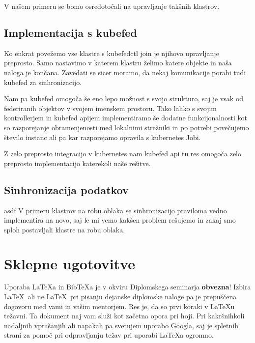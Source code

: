 \documentclass[a4paper, 12pt]{book}
\newcommand{\BibTeX}{{\sc Bib}\TeX}
\begin{document}
V našem primeru se bomo osredotočali na upravljanje takšnih klastrov.

\section{Implementacija s kubefed}
Ko enkrat povežemo vse klastre s kubefedctl join je njihovo upravljanje preprosto.
Samo nastavimo v katerem klastru želimo katere objekte in naša naloga je končana.
Zavedati se sicer moramo, da nekaj komunikacije porabi tudi kubefed za sinhronizacijo.

Nam pa kubefed omogoča še eno lepo možnost s svojo strukturo, saj je vsak od federiranih objektov v svojem imenskem prostoru.
Tako lahko s svojim kontrollerjem in kubefed apijem implementiramo še dodatne funkcijonalnosti kot so razporejanje obramenjenosti med lokalnimi strežniki in po potrebi povečujemo število instanc ali pa kar razporejamo opravila s kubernetes Jobi.

Z zelo preprosto integracijo v kubernetes nam kubefed api tu res omogoča zelo preprosto implementacijo katerekoli naše rešitve.
\section{Sinhronizacija podatkov}
asdf V primeru klastrov na robu oblaka se sinhronizacijo praviloma vedno implementira na novo, saj le mi vemo kakšen problem rešujemo in zakaj smo sploh postavljali klastre na robu oblaka.


\chapter{Sklepne ugotovitve}
Uporaba \LaTeX{a} in \BibTeX{a} je v okviru Diplomskega seminarja \textbf{obvezna}!
Izbira \LaTeX\ ali ne \LaTeX\ pri pisanju dejanske diplomske naloge pa je pre\-pu\-šče\-na dogovoru med vami in vašim mentorjem.
Res je, da so prvi koraki v \LaTeX{}u težavni. 
Ta dokument naj vam služi kot začetna opora pri hoji.
Pri kakršnihkoli nadaljnih vprašanjih ali napakah pa svetujem uporabo Googla, saj je spletnih strani za pomoč pri odpravljanju težav pri uporabi \LaTeX{}a ogromno.
\newpage %
\ \\
\clearpage
{}


\end{document}
